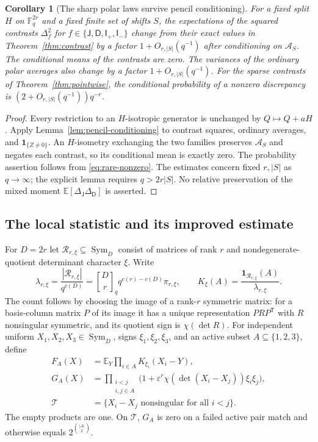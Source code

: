 \documentclass[11pt,a4paper]{article}
\newtheorem{corollary}[theorem]{Corollary}
\theoremstyle{definition}
\theoremstyle{remark}
\newcommand{\F}{\mathbb F}
\newcommand{\E}{\mathbb E}
\newcommand{\Sym}{\operatorname{Sym}}
\newcommand{\eps}{\varepsilon}
\newcommand{\J}{\mathsf J}
\newcommand{\D}{\mathsf D}
\newcommand{\I}{\mathsf I}
\newcommand{\one}{\mathbf 1}
\newcommand{\gb}[2]{\genfrac{[}{]}{0pt}{}{#1}{#2}_{q}}
\begin{document}
\begin{corollary}[The sharp polar laws survive pencil conditioning]
\label{cor:conditional-polar}
For a fixed split $H$ on $\F_q^{2r}$ and a fixed finite set of shifts
$S$, the expectations of the squared contrasts $\Delta_f^2$ for
$f\in\{\J,\D,\I_+,\I_-\}$ change from their exact values in
Theorem~\ref{thm:contrast} by a factor $1+O_{r,|S|}(q^{-1})$
after conditioning on $\mathcal A_S$. The conditional means of the
contrasts are zero.
The variances of the ordinary polar averages also change by a factor
$1+O_{r,|S|}(q^{-1})$.
For the sparse contrasts of Theorem~\ref{thm:pointwise}, the conditional
probability of a nonzero discrepancy is
$(2+O_{r,|S|}(q^{-1}))q^{-r}$.
\end{corollary}
\begin{proof}
Every restriction to an $H$-isotropic generator is unchanged by
$Q\mapsto Q+aH$. Apply Lemma~\ref{lem:pencil-conditioning} to contrast
squares, ordinary averages, and $\one_{\{Z\ne0\}}$.
An $H$-isometry exchanging the two families preserves
$\mathcal A_S$ and negates each contrast, so its conditional mean is
exactly zero. The probability assertion follows from
\eqref{eq:rare-nonzero}. The estimates concern fixed $r,|S|$ as
$q\to\infty$; the explicit lemma requires $q>2r|S|$.
No relative preservation of the mixed moment
$\E[\Delta_\J\Delta_\D]$ is asserted.
\end{proof}

\subsection{The local statistic and its improved estimate}
For $D=2r$ let $\mathcal R_{r,\xi}\subseteq\Sym_D$ consist of matrices of
rank $r$ and nondegenerate-quotient determinant character $\xi$. Write
\begin{equation}\label{eq:rank-layer-normalization}
 \lambda_{r,\xi}=\frac{|\mathcal R_{r,\xi}|}{q^{c(D)}}
 =\gb Dr q^{c(r)-c(D)}\pi_{r,\xi},\qquad
 K_\xi(A)=\frac{\one_{\mathcal R_{r,\xi}}(A)}{\lambda_{r,\xi}}.
\end{equation}
The count follows by choosing the image of a rank-$r$ symmetric matrix:
for a basis-column matrix $P$ of its image it has a unique representation
$PRP^{\mathsf T}$ with $R$ nonsingular symmetric, and its quotient sign
is $\chi(\det R)$.
For independent uniform $X_1,X_2,X_3\in\Sym_D$, signs
$\xi_1,\xi_2,\xi_3$, and an active subset $A\subseteq\{1,2,3\}$, define
\begin{align}
 F_A(X)&=\E_Y\prod_{i\in A}K_{\xi_i}(X_i-Y),\label{eq:local-F}\\
 G_A(X)&=\prod_{\substack{i<j\\i,j\in A}}
 \bigl(1+\eps^r\chi(\det(X_i-X_j))\xi_i\xi_j\bigr),
 \label{eq:local-G}\\
 \mathcal T&=\{X_i-X_j\text{ nonsingular for all }i<j\}.
 \label{eq:local-T}
\end{align}
The empty products are one. On $\mathcal T$, $G_A$ is zero on a failed
active pair match and otherwise equals $2^{\binom{|A|}{2}}$.
\end{document}
